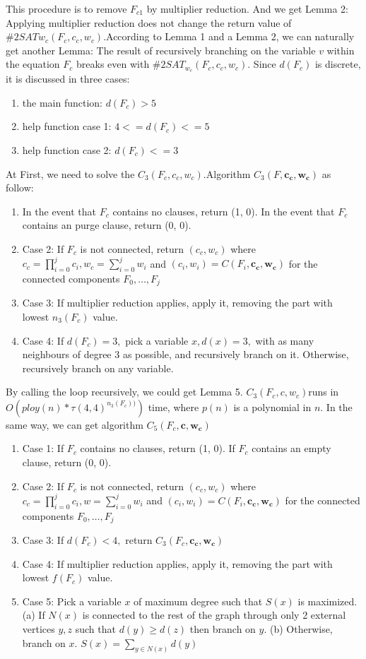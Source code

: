 \documentclass{sigchi}
\begin{document}
This procedure is to remove $F_{c1}$ by multiplier reduction. And we get Lemma 2: Applying multiplier reduction does not change the return value of $\#2SAT w_{c} (F_{c}, c_{c}, w_{c})$.According to Lemma 1 and a Lemma 2, we can naturally get another Lemma: The result of recursively branching on the variable $v$ within the equation $F_{c}$  breaks even with $\#2SAT_{w_{c}}(F_{c}, c_{c}, w_{c})$. Since $d(F_{c})$ is discrete, it is discussed in three cases:
\begin{enumerate}
	\item the main function: $d(F_{c})>5$
	\item help function case 1: $4<=d(F_{c})<=5$
	\item help function case 2: $d(F_{c})<=3$
\end{enumerate}
At First, we need to solve the $C_{3}(F_{c},c_{c},w_{c})$.Algorithm $C_{3}(F, \mathbf{c_{c}}, \mathbf{w_{c}})$ as follow:
\begin{enumerate}	
	\item In the event that $F_{c}$ contains no clauses, return (1, 0). In the event that $F_{c}$ contains an purge clause, return (0, 0).
	\item Case 2: If $F_{c}$ is not connected, return $(c_{c}, w_{c})$ where $c_{c}=\prod_{i=0}^{j} c_{i}, w_{c}=\sum_{i=0}^{j} w_{i}$ and $\left(c_{i}, w_{i}\right)=C\left(F_{i}, \mathbf{c_{c}}, \mathbf{w_{c}}\right)$ for the connected components $F_{0}, \ldots, F_{j}$
	\item Case 3: If multiplier reduction applies, apply it, removing the part with lowest $n_{3}(F_{c})$ value.
	\item Case 4: If $d(F_{c})=3,$ pick a variable $x, d(x)=3,$ with as many neighbours of degree 3 as possible, and recursively branch on it. Otherwise, recursively branch on any variable.$  $
\end{enumerate}
By calling the loop recursively, we could get Lemma 5. $C_{3}(F_{c} ,c,w_{c})$runs in $O(ploy(n)*\tau(4,4)^{n_{3}(F_{c}))})$ time, where $p(n)$ is a polynomial in $n$. In the same way, we can get	algorithm $C_{5}(F_{c}, \mathbf{c}, \mathbf{w_{c}})$
\begin{enumerate}
	\item Case 1: If $F_{c}$ contains no clauses, return (1, 0). If $F_{c}$ contains an empty clause, return (0, 0).
	\item Case 2: If $F_{c}$ is not connected, return $(c_{c}, w_{c})$ where $c_{c}=\prod_{i=0}^{j} c_{i}, w=\sum_{i=0}^{j} w_{i}$ and $\left(c_{i}, w_{i}\right)=C\left(F_{i}, \mathbf{c_{c}}, \mathbf{w_{c}}\right)$ for the connected components $F_{0}, \ldots, F_{j}$
	\item Case 3: If $d(F_{c})<4,$ return $C_{3}(F_{c}, \mathbf{c_{c}}, \mathbf{w_{c}})$ 
	\item Case 4: If multiplier reduction applies, apply it, removing the part with lowest $f(F_{c})$ value.
	\item Case 5: Pick a variable $x$ of maximum degree such that $S(x)$ is maximized. (a) If $N(x)$ is connected to the rest of the graph through only 2 external vertices $y, z$ such that $d(y) \geqslant d(z)$ then branch on $y .$
	(b) Otherwise, branch on $x .$
	$S(x)=\sum_{y \in N(x)} d(y)$
\end{enumerate}
\end{document}
